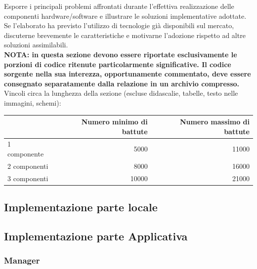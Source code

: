 \documentclass[12pt]{article}
\begin{document}
Esporre i principali problemi affrontati durante l'effettiva realizzazione delle componenti hardware/software e illustrare le soluzioni implementative adottate. Se l'elaborato ha previsto l'utilizzo di tecnologie già disponibili sul mercato, discuterne brevemente le caratteristiche e motivarne l'adozione rispetto ad altre soluzioni assimilabili.\\

\textbf{NOTA: in questa sezione devono essere riportate esclusivamente le porzioni di codice ritenute particolarmente significative. Il codice sorgente nella sua interezza, opportunamente commentato, deve essere consegnato separatamente dalla relazione in un archivio compresso.}\\


Vincoli circa la lunghezza della sezione (escluse didascalie, tabelle, testo nelle immagini, schemi):

\vspace{1cm}
\begin{tabular}{l|rr}
 & Numero minimo di battute & Numero massimo di battute \\
 \hline
 1 componente & 5000 & 11000 \\
 2 componenti & 8000 & 16000 \\
 3 componenti & 10000 & 21000 \\
 \hline
\end{tabular}
\newpage
\subsection{Implementazione parte locale}
\newpage
\subsection{Implementazione parte Applicativa}
\subsubsection{Manager}
\end{document}
